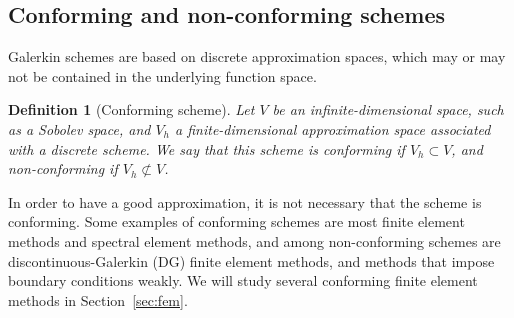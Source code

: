 \documentclass{article}
\renewcommand{\vec}{\vectorsym}
\DeclareMathOperator{\dive}{\text{div}}
\DeclareMathOperator{\curl}{\text{curl}}
\newtheorem{definition}{Definition}
\newtheorem{lemma}{Lemma}
\begin{document}
\subsection{Conforming and non-conforming schemes} 
Galerkin schemes are based on discrete approximation spaces, which may or may not be contained in the underlying function space.
\begin{definition}[Conforming scheme]
    Let $V$ be an infinite-dimensional space, such as a Sobolev space, and $V_h$ a finite-dimensional approximation space associated with a discrete scheme. We say that this scheme is \textit{conforming} if $V_h\subset V$, and \textit{non-conforming} if $V_h\not\subset V$. 
\end{definition}

In order to have a good approximation, it is not necessary that the scheme is conforming. Some examples of conforming schemes are most finite element methods and spectral element methods, and among non-conforming schemes are discontinuous-Galerkin (DG) finite element methods, and methods that impose boundary conditions weakly. We will study several conforming finite element methods in Section~\ref{sec:fem}. 
\end{document}
